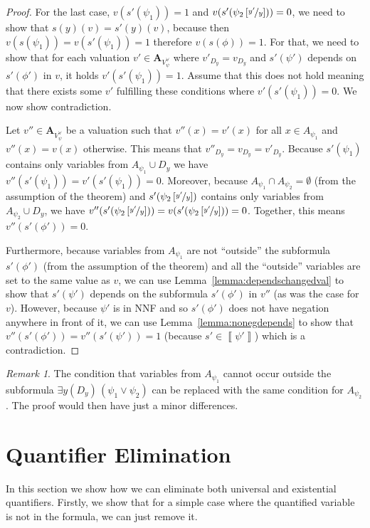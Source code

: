 \documentclass[
  digital, %
  color,
  twoside, %
  table,   %
  nolof,     %
  nolot,     %
]{fithesis3}
\theoremstyle{definition}
\theoremstyle{remark}
\newtheorem*{remark}{Remark}
\newcommand{\seman}[1]{\left\llbracket {#1} \right\rrbracket}
\newcommand{\substitute}[2]{\left[ \nicefrac{#2}{#1} \right]}
\newcommand{\valtns}[1]{\mathbf{A}_{#1}}
\newcommand{\uvars}[1]{V_{#1}^{\forall}}
\newcommand{\itholds}{\,}
\begin{document}
\begin{proof}
  For the last case, $v(s'(\psi_1)) = 1$ and $v(s'(\psi_2\substitute{y}{y'})) = 0$, we need to show that $s(y)(v) = s'(y)(v)$, because then $v(s(\psi_1)) = v(s'(\psi_1)) = 1$ therefore $v(s(\phi)) = 1$. For that, we need to show that for each valuation $v' \in \valtns{\uvars{\psi}}$ where $v'_{D_y} = v_{D_y}$ and $s'(\psi')$ depends on $s'(\phi')$ in $v$, it holds $v'(s'(\psi_1)) = 1$. Assume that this does not hold meaning that there exists some $v'$ fulfilling these conditions where $v'(s'(\psi_1)) = 0$. We now show contradiction.
  
  Let $v'' \in \valtns{\uvars{\psi}}$ be a valuation such that $v''(x) = v'(x)$ for all $x \in A_{\psi_1}$ and $v''(x) = v(x)$ otherwise. This means that $v''_{D_y} = v_{D_y} = v'_{D_y}$. Because $s'(\psi_1)$ contains only variables from $A_{\psi_1} \cup D_y$ we have $v''(s'(\psi_1)) = v'(s'(\psi_1)) = 0$. Moreover, because $A_{\psi_1} \cap A_{\psi_2} = \emptyset$ (from the assumption of the theorem) and $s'(\psi_2\substitute{y}{y'})$ contains only variables from $A_{\psi_2} \cup D_y$, we have $v''(s'(\psi_2\substitute{y}{y'})) = v(s'(\psi_2\substitute{y}{y'})) = 0$. Together, this means $v''(s'(\phi')) = 0$.
  
  Furthermore, because variables from $A_{\psi_1}$ are not ``outside'' the subformula $s'(\phi')$ (from the assumption of the theorem) and all the ``outside'' variables are set to the same value as $v$, we can use Lemma~\ref{lemma:dependschangedval} to show that $s'(\psi')$ depends on the subformula $s'(\phi')$ in $v''$ (as was the case for $v$). However, because $\psi'$ is in NNF and so $s'(\phi')$ does not have negation anywhere in front of it, we can use Lemma~\ref{lemma:nonegdepends} to show that $v''(s'(\phi')) = v''(s'(\psi')) = 1$ (because $s' \in \seman{\psi'}$) which is a contradiction.
\end{proof}

\begin{remark}
  The condition that variables from $A_{\psi_1}$ cannot occur outside the subformula $\exists y(D_y) \itholds (\psi_1 \lor \psi_2)$ can be replaced with the same condition for $A_{\psi_2}$. The proof would then have just a minor differences.
\end{remark}

\section{Quantifier Elimination}
\label{sec:quantElimination}
In this section we show how we can eliminate both universal and existential quantifiers. Firstly, we show that for a simple case where the quantified variable is not in the formula, we can just remove it.
\end{document}
